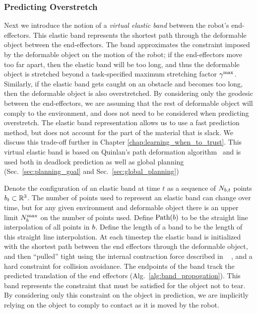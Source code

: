 \subsubsection{Predicting Overstretch}
\label{sec:overstretch}


Next we introduce the notion of a \textit{virtual elastic band} between the robot's end-effectors. This elastic band represents the shortest path through the deformable object between the end-effectors. The band approximates the constraint imposed by the deformable object on the motion of the robot; if the end-effectors move too far apart, then the elastic band will be too long, and thus the deformable object is stretched beyond a task-specified maximum stretching factor $\gamma^{\textrm{max}}$. Similarly, if the elastic band gets caught on an obstacle and becomes too long, then the deformable object is also overstretched. By considering only the geodesic between the end-effectors, we are assuming that the rest of deformable object will comply to the environment, and does not need to be considered when predicting overstretch. The elastic band representation allows us to use a fast prediction method, but does not account for the part of the material that is slack. We discuss this trade-off further in Chapter \ref{chap:learning_when_to_trust}. This virtual elastic band is based on Quinlan's path deformation algorithm~\cite{Quinlan1994} and is used both in deadlock prediction as well as global planning (Sec.~\ref{sec:planning_goal} and Sec.~\ref{sec:global_planning})


Denote the configuration of an elastic band at time $t$ as a sequence of $N_{b,t}$ points $b_t \subset \mathbb{R}^3$. The number of points used to represent an elastic band can change over time, but for any given environment and deformable object there is an upper limit $N_b^\textrm{max}$ on the number of points used. Define $\textrm{Path}(b)$ to be the straight line interpolation of all points in $b$. Define the length of a band to be the length of this straight line interpolation. At each timestep the elastic band is initialized with the shortest path between the end effectors through the deformable object, and then ``pulled'' tight using the internal contraction force described in ~\cite{Quinlan1994} , and a hard constraint for collision avoidance. The endpoints of the band track the predicted translation of the end effectors (Alg.~\ref{alg:band_propogation}). This band represents the constraint that must be satisfied for the object not to tear. By considering only this constraint on the object in prediction, we are implicitly relying on the object to comply to contact as it is moved by the robot. %



